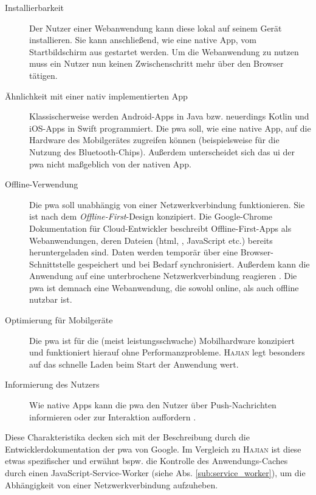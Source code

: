 \begin{description}
	\item[Installierbarkeit]
	Der Nutzer einer Webanwendung kann diese lokal auf seinem Gerät installieren. Sie kann anschließend, wie eine native App, vom Startbildschirm aus gestartet werden. Um die Webanwendung zu nutzen muss ein Nutzer nun keinen Zwischenschritt mehr über den Browser tätigen.
  
	\item[Ähnlichkeit mit einer nativ implementierten App]  
	Klassischerweise werden Android-Apps in Java bzw. neuerdings Kotlin und iOS-Apps in Swift programmiert. Die \ac{pwa} soll, wie eine native App, auf die Hardware des Mobilgerätes zugreifen können (beispielsweise für die Nutzung des Bluetooth-Chips). Außerdem unterscheidet sich das \ac{ui} der \ac{pwa} nicht maßgeblich von der nativen App. 
  
	\item[Offline-Verwendung] 
	Die \ac{pwa} soll unabhängig von einer Netzwerkverbindung funktionieren. Sie ist nach dem \textit{Offline-First}-Design konzipiert. Die Google-Chrome Dokumentation für Cloud-Entwickler beschreibt Offline-First-Apps als Webanwendungen, deren Dateien (\acs{html}, , JavaScript etc.) bereits heruntergeladen sind. Daten werden temporär über eine Browser-Schnittstelle gespeichert und bei Bedarf synchronisiert. Außerdem kann die Anwendung auf eine unterbrochene Netzwerkverbindung reagieren \cite{GoogleOfflineApps}. Die \ac{pwa} ist demnach eine Webanwendung, die sowohl online, als auch offline nutzbar ist.

	\item[Optimierung für Mobilgeräte]  
  	Die \ac{pwa} ist für die (meist leistungsschwache) Mobilhardware konzipiert und funktioniert hierauf ohne Performanzprobleme. \textsc{Hajian} legt besonders auf das schnelle Laden beim Start der Anwendung wert.
  	
  	\item[Informierung des Nutzers] 
  	Wie native Apps kann die \ac{pwa} den Nutzer über Push-Nachrichten informieren oder zur Interaktion auffordern \cite[S. 1f.]{Hajian2019}.
\end{description}

Diese Charakteristika decken sich mit der Beschreibung durch die Entwicklerdokumentation der \ac{pwa} von Google. Im Vergleich zu \textsc{Hajian} ist diese etwas spezifischer und erwähnt bspw. die Kontrolle des Anwendungs-Caches durch einen JavaScript-Service-Worker (siehe Abs. \ref{sub:service_worker}), um die Abhängigkeit von einer Netzwerkverbindung aufzuheben.
\cite{GooglePWAOverview}



